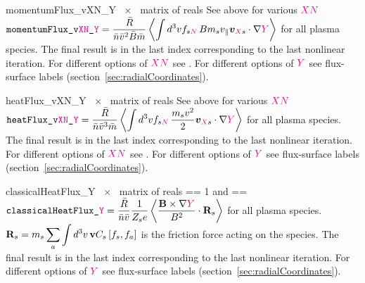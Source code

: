 {momentumFlux_vXN_Y}
{~$\times$~ matrix of reals}
{See above for various $\textcolor{magenta}{XN}$}
{$\displaystyle \text{\ttfamily momentumFlux\_v\textcolor{magenta}{XN}\_\textcolor{magenta}{Y}} = \frac{\bar{R}}{\bar{n} \bar{v}^2 \bar{B} \bar{m}} \left\langle \int d^3v f_{s\textcolor{magenta}{N}} \, B m_s v_{\|} \bm{v}_{\textcolor{magenta}{X}s} \cdot \nabla \textcolor{magenta}{Y}\right\rangle$ for all plasma species. The final result is in the last index corresponding to the last nonlinear iteration.\newline
For different options of $\textcolor{magenta}{XN}$ see  
.\newline
For different options of $\textcolor{magenta}{Y}$ see flux-surface labels (section~\ref{sec:radialCoordinates}).}

\myhrule

{heatFlux_vXN_Y}
{~$\times$~ matrix of reals}
{See above for various $\textcolor{magenta}{XN}$}
{$\displaystyle \text{\ttfamily heatFlux\_v\textcolor{magenta}{XN}\_\textcolor{magenta}{Y}} = \frac{\bar{R}}{\bar{n} \bar{v}^3 \bar{m}} \left\langle \int d^3v f_{s\textcolor{magenta}{N}} \, \frac{m_s v^2}{2} \bm{v}_{\textcolor{magenta}{X}s} \cdot \nabla \textcolor{magenta}{Y}\right\rangle$ for all plasma species. The final result is in the last index corresponding to the last nonlinear iteration.\newline
For different options of $\textcolor{magenta}{XN}$ see  
.\newline
For different options of $\textcolor{magenta}{Y}$ see flux-surface labels (section~\ref{sec:radialCoordinates}).}

\myhrule

{classicalHeatFlux_Y}
{~$\times$~ matrix of reals}
{ == 1 and  == \true}
{\newline
$\displaystyle \text{\ttfamily classicalHeatFlux\_\textcolor{magenta}{Y}} = \frac{\bar{R}}{\bar{n} \bar{v}} \frac{1}{Z_s e} \left\langle \frac{{\mathbf B} \times \nabla \textcolor{magenta}{Y}}{B^2} \cdot {\mathbf R}_s \right\rangle$ for all plasma species. $\displaystyle {\mathbf R}_s = m_s \sum_a \int d^3v \, {\mathbf v} C_s \left[f_s, f_a\right]$ is the friction force acting on the species. The final result is in the last index corresponding to the last nonlinear iteration.\newline
For different options of $\textcolor{magenta}{Y}$ see flux-surface labels (section~\ref{sec:radialCoordinates}).}


